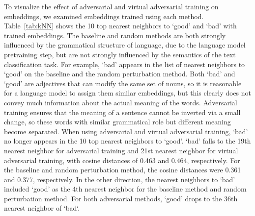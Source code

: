 \documentclass{article}
\begin{document}
To visualize the effect of adversarial and virtual adversarial training on
embeddings, we examined embeddings trained using each method.
Table~\ref{tab:kNN} shows the 10 top nearest neighbors to `good' and `bad' with
trained embeddings.
The baseline and random methods are both strongly influenced by the grammatical structure of language,
due to the language model pretraining step, but are not strongly influenced by the
semantics of the text classification task.
For example, `bad' appears in the list of nearest neighbors to `good' on the baseline and
the random perturbation method.
Both `bad' and `good' are adjectives that can modify the same set of nouns, so
it is reasonable for a language model to assign them similar embeddings,
but this clearly does not convey much information about the actual meaning of the words.
Adversarial training ensures that the meaning of a sentence cannot be inverted via
a small change, so these words with similar grammatical role but different meaning
become separated.
When using adversarial and virtual adversarial training,
`bad' no longer appears in the 10 top nearest neighbors to `good'.
`bad' falls to the 19th
nearest neighbor for adversarial training and 21st nearest neighbor for
virtual adversarial training, with cosine distances of 0.463 and 0.464, respectively.
For the baseline and random perturbation method, the cosine distances were
0.361 and 0.377, respectively.
In the other direction,
the nearest neighbors to `bad' included `good' as the 4th nearest neighbor
for the baseline method and random perturbation method. For both adversarial
methods, `good' drops to the 36th nearest neighbor of `bad`.
\end{document}
